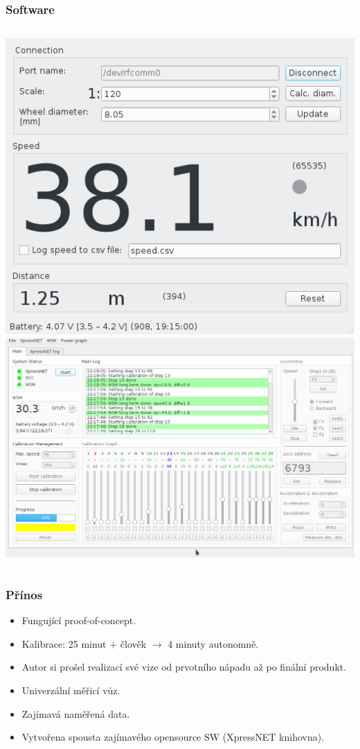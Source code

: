 \documentclass[aspectratio=169]{beamer}
\begin{document}

\begin{frame}
\frametitle{Software}
\begin{columns}[t]
	\includegraphics[align=c,width=\columnwidth]{data/speed_reader_screenshot.png}
	\pause
	\includegraphics[align=c,width=\columnwidth]{data/ac_progress.png}
\end{columns}
\end{frame}


\begin{frame}
\frametitle{Přínos}
\begin{itemize}
\item Fungující proof-of-concept.
\item Kalibrace: 25 minut + člověk $\rightarrow$ 4 minuty autonomně.
\item Autor si prošel realizací své vize od prvotního nápadu až po finální produkt.
\item Univerzální měřicí vůz.
\item Zajímavá naměřená data.
\item Vytvořena spousta zajímavého opensource SW (XpressNET knihovna).
\end{itemize}
\end{frame}

\end{document}
